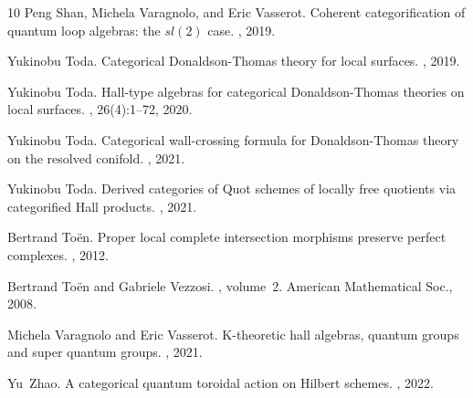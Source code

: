 \documentclass{amsart}
\numberwithin{equation}{section}
\theoremstyle{definition}
\theoremstyle{remark}
\begin{document}
\begin{thebibliography}{10}
Peng Shan, Michela Varagnolo, and Eric Vasserot.
\newblock Coherent categorification of quantum loop algebras: the $ sl (2) $
  case.
, 2019.

Yukinobu Toda.
\newblock Categorical {D}onaldson-{T}homas theory for local surfaces.
, 2019.

Yukinobu Toda.
\newblock Hall-type algebras for categorical {Donaldson-Thomas} theories on
  local surfaces.
, 26(4):1--72, 2020.

Yukinobu Toda.
\newblock Categorical wall-crossing formula for {D}onaldson-{T}homas theory on
  the resolved conifold.
, 2021.

Yukinobu Toda.
\newblock Derived categories of {Q}uot schemes of locally free quotients via
  categorified {H}all products.
, 2021.

Bertrand To{\"e}n.
\newblock Proper local complete intersection morphisms preserve perfect
  complexes.
, 2012.

Bertrand To{\"e}n and Gabriele Vezzosi.
, volume~2.
\newblock American Mathematical Soc., 2008.

Michela Varagnolo and Eric Vasserot.
\newblock K-theoretic hall algebras, quantum groups and super quantum groups.
, 2021.

Yu~Zhao.
\newblock A categorical quantum toroidal action on {Hilbert} schemes.
, 2022.

\end{thebibliography}
\end{document}
